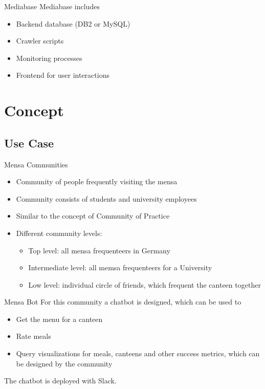 \begin{frame}{Mediabase}
  Mediabase includes
  \begin{itemize}
    \item Backend database (DB2 or MySQL)
    \item Crawler scripts
    \item Monitoring processes
    \item Frontend for user interactions
  \end{itemize}
\end{frame}

\section{Concept}
\subsection{Use Case}
\begin{frame}{Mensa Communities}
  \begin{itemize}
    \item Community of people frequently visiting the mensa
    \item Community consists of students and university employees
    \item Similar to the concept of Community of Practice %
    \item Different community levels:
          \begin{itemize}
            \item Top level: all mensa frequenteers in Germany
            \item Intermediate level: all memsa frequenteers for a University
            \item Low level: individual circle of friends, which frequent the canteen together %
          \end{itemize}
  \end{itemize}
\end{frame}



\begin{frame}{Mensa Bot}
  For this community a chatbot is designed, which can be used to
  \begin{itemize}
    \item Get the menu for a canteen
    \item Rate meals
    \item Query visualizations for meals, canteens and other success metrics, which can be designed by the community
  \end{itemize}
  The chatbot is deployed with Slack.
\end{frame}

